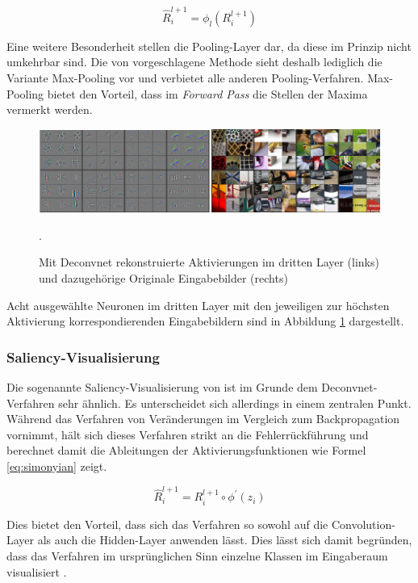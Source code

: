 \begin{equation}
\label{eq:zeiler2}
\hat{R}^{l+1}_i = \phi_l(R^{l+1}_i)
\end{equation}

Eine weitere Besonderheit stellen die Pooling-Layer dar, da diese im Prinzip nicht umkehrbar sind. Die von \cite{Zeiler2014} vorgeschlagene Methode sieht deshalb lediglich die Variante Max-Pooling vor und verbietet alle anderen Pooling-Verfahren. Max-Pooling bietet den Vorteil, dass im \textit{Forward Pass} die Stellen der Maxima vermerkt werden.

\begin{figure}
\centering
\includegraphics[width=0.9\linewidth]{images/4_zeiler}
\caption[]{Mit Deconvnet rekonstruierte Aktivierungen im dritten Layer (links) und dazugehörige Originale Eingabebilder (rechts) \cite[siehe][]{Zeiler2014}}.
\label{fig:4_zeiler}
\end{figure}

Acht ausgewählte Neuronen im dritten Layer mit den jeweiligen zur höchsten Aktivierung korrespondierenden Eingabebildern sind in Abbildung \ref{fig:4_zeiler} dargestellt.

\subsubsection{Saliency-Visualisierung}
Die sogenannte Saliency-Visualisierung von \cite{Simonyan2013} ist im Grunde dem Deconvnet-Verfahren sehr ähnlich. Es unterscheidet sich allerdings in einem zentralen Punkt. 
Während das Verfahren von \cite{Zeiler2014} Veränderungen im Vergleich zum Backpropagation vornimmt, hält sich dieses Verfahren strikt an die Fehlerrückführung und berechnet damit die Ableitungen der Aktivierungsfunktionen wie Formel \ref{eq:simonyian} zeigt. 

\begin{equation}
\label{eq:simonyian}
\hat{R}^{l+1}_i = R^{l+1}_i \circ \phi^{'}(z_i)
\end{equation}

Dies bietet den Vorteil, dass sich das Verfahren so sowohl auf die Convolution-Layer als auch die Hidden-Layer anwenden lässt. Dies lässt sich damit begründen, dass das Verfahren im ursprünglichen Sinn einzelne Klassen im Eingaberaum visualisiert \cite[vgl.][]{Simonyan2013}.


